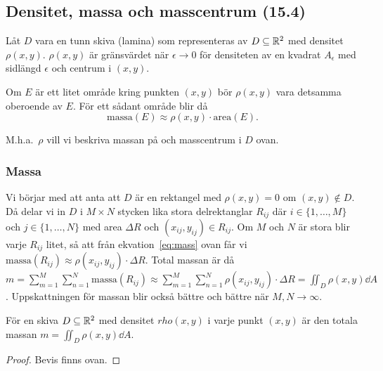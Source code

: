 \documentclass[a4paper]{article}
\begin{document}
\providecommand\fname{}
\renewcommand\fname{19-09-30}

\subsection{Densitet, massa och masscentrum (15.4)}
Låt \(
    D 
\) vara en tunn skiva (lamina) som representeras av \(
    D \subseteq \mathbb{R}^2
\) med densitet \(
    \rho(x,y)
\). \(
    \rho(x,y)
\) är gränsvärdet när \(
    \epsilon \to 0
\) för densiteten av en kvadrat \(
    A_\epsilon
\) med sidlängd \(
    \epsilon
\) och centrum i \(
    (x,y)
\). 

Om \(
    E
\) är ett litet område kring punkten \(
    (x,y)
\) bör \(
    \rho(x,y) 
\) vara detsamma oberoende av \(
    E
\). För ett sådant område blir då 
\begin{equation}\label{eq:mass}
    \text{massa}(E) \approx \rho(x,y)\cdot \text{area}(E).
\end{equation}

M.h.a.\ \(
    \rho
\) vill vi beskriva massan på och masscentrum i \(
    D
\) ovan.

\subsubsection{Massa}
Vi börjar med att anta att \(
    D
\) är en rektangel med \(
    \rho(x,y) = 0
\) om \(
    (x,y) \not\in D
\). Då delar vi in \(
    D
\) i \(
    M\times N
\) stycken lika stora delrektanglar \(
    R_{ij}
\) där \(
    i \in \{1, \dots, M\}
\) och \(
    j \in \{1, \dots, N\}
\) med area \(
    \Delta R
\) och \(
    (x_{ij}, y_{ij}) \in R_{ij}
\). Om \(
    M
\) och \(
    N
\) är stora blir varje \(
    R_{ij}
\) litet, så att från ekvation~\ref{eq:mass}
ovan får vi \(
    \text{massa}(R_{ij}) \approx \rho(x_{ij}, y_{ij}) \cdot \Delta R 
\). Total massan är då \(
    m = \sum_{m=1}^M \sum_{n=1}^N \text{massa}(R_{ij})
        \approx  \sum_{m=1}^M \sum_{n=1}^N \rho(x_{ij}, y_{ij}) \cdot \Delta R 
        = \iint_D \rho(x, y) \dd A
\). Uppskattningen för massan blir också bättre och bättre när \(
    M, N \to \infty
\). 

\begin{sats}
    För en skiva \(
        D \subseteq \mathbb{R}^2
    \) med densitet \(
        rho(x,y)
    \) i varje punkt \(
        (x,y)
    \) är den totala massan \(
        m = \iint_D \rho(x,y) \dd A
    \).

    \begin{proof}
        Bevis finns ovan.
    \end{proof}
\end{sats}
\end{document}
